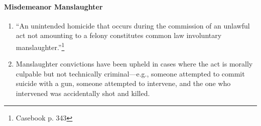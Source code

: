 \paragraph{Misdemeanor Manslaughter}

\begin{enumerate}
    \item ``An unintended homicide that occurs during the commission of an unlawful act not amounting to a felony constitutes common law involuntary manslaughter.''\footnote{Casebook p. 343}
    \item Manslaughter convictions have been upheld in cases where the act is morally culpable but not technically criminal---e.g., someone attempted to commit suicide with a gun, someone attempted to intervene, and the one who intervened was accidentally shot and killed.
\end{enumerate}
